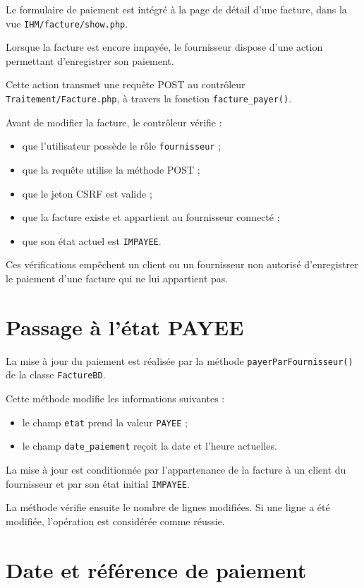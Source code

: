 Le formulaire de paiement est intégré à la page de détail d'une facture, dans la vue \texttt{IHM/facture/show.php}.

Lorsque la facture est encore impayée, le fournisseur dispose d'une action permettant d'enregistrer son paiement.

Cette action transmet une requête POST au contrôleur \texttt{Traitement/Facture.php}, à travers la fonction \texttt{facture\_payer()}.

Avant de modifier la facture, le contrôleur vérifie :
\begin{itemize}
    \item que l'utilisateur possède le rôle \texttt{fournisseur} ;
    \item que la requête utilise la méthode POST ;
    \item que le jeton CSRF est valide ;
    \item que la facture existe et appartient au fournisseur connecté ;
    \item que son état actuel est \texttt{IMPAYEE}.
\end{itemize}

Ces vérifications empêchent un client ou un fournisseur non autorisé d'enregistrer le paiement d'une facture qui ne lui appartient pas.

\section{Passage à l'état PAYEE}

La mise à jour du paiement est réalisée par la méthode \texttt{payerParFournisseur()} de la classe \texttt{FactureBD}.

Cette méthode modifie les informations suivantes :
\begin{itemize}
    \item le champ \texttt{etat} prend la valeur \texttt{PAYEE} ;
    \item le champ \texttt{date\_paiement} reçoit la date et l'heure actuelles.
\end{itemize}

La mise à jour est conditionnée par l'appartenance de la facture à un client du fournisseur et par son état initial \texttt{IMPAYEE}.

La méthode vérifie ensuite le nombre de lignes modifiées. Si une ligne a été modifiée, l'opération est considérée comme réussie.

\section{Date et référence de paiement}

